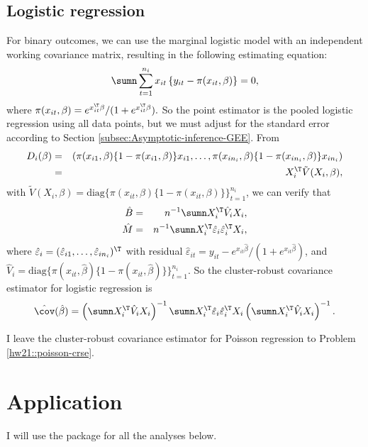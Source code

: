 \subsection{Logistic regression}\label{sec::crse-logit}

For binary outcomes, we can use the marginal logistic model with an independent working covariance matrix,
resulting in the following estimating equation:
\[
\sumn\sum_{t=1}^{n_{i}}x_{it} \left\{ y_{it}-  \pi(x_{it}, \beta)\right\} =0 , 
\]
where $ \pi(x_{it}, \beta) =  e^{x_{it}^{\T}\beta} / (1+e^{x_{it}^{\T}\beta} )  .$
So the point estimator is  the pooled logistic regression using all data
points, but we must adjust for the standard error according to Section
\ref{subsec:Asymptotic-inference-GEE}. From
\begin{eqnarray*}
D_i(\beta) &=&  (
 \pi(x_{i1}, \beta) \{1- \pi(x_{i1}, \beta)\} x_{i1}, \ldots, 
 \pi(x_{in_i}, \beta)\{1- \pi(x_{in_i}, \beta)\} x_{in_i} 
) \\
&=&  X_i^{\T} \tilde{V}(X_i, \beta),
\end{eqnarray*}
with $ \tilde{V}(X_i, \beta) = \text{diag}\{  \pi(x_{it}, \beta) \{1- \pi(x_{it}, \beta)\} \}_{t=1}^{n_i}$,
we can verify that
\begin{eqnarray*}
\hat{B} &=& n^{-1} \sumn X_i^{\T}  \hat{V}_i X_i,\\ 
\hat{M} &=& n^{-1} \sumn X_i^{\T}  \hat{\varepsilon}_i   \hat{\varepsilon}_i^{\T} X_i,
\end{eqnarray*}
where $\hat{\varepsilon}_{i} = (\hat{\varepsilon}_{i1}, \ldots, \hat{\varepsilon}_{in_i})^{\T}$ with residual
$\hat{\varepsilon}_{it}=y_{it}-e^{x_{it}\hat{\beta}}/(1+e^{x_{it}\hat{\beta}}) $, and $\hat{V}_i = \text{diag}\{  \pi(x_{it}, \hat{\beta}) \{1- \pi(x_{it}, \hat{\beta})\} \}_{t=1}^{n_i}.$
So the cluster-robust covariance estimator for logistic regression is
\[
\hat{\cov}(\hat{\beta})=\left(\sumn X_{i}^{\T} \hat{V}_i X_{i}\right)^{-1}
\sumn X_{i}^{\T}\hat{\varepsilon}_{i}\hat{\varepsilon}_{i}^{\T}X_{i}
\left(\sumn X_{i}^{\T} \hat{V}_i X_{i}\right)^{-1}.
\]
 

I leave the cluster-robust covariance estimator for Poisson regression to Problem \ref{hw21::poisson-crse}. 



\section{Application}

I will use the  package for all the analyses below. 



